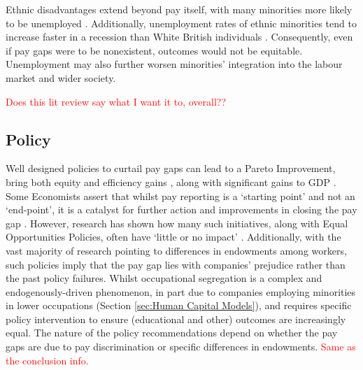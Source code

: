 \documentclass[class=article, crop=false]{standalone}
\begin{document}
Ethnic disadvantages extend beyond pay itself, with many minorities more likely to be unemployed \citep{Heath}. Additionally, unemployment rates of ethnic minorities tend to increase faster in a recession than White British individuals \citep{Jones}. Consequently, even if pay gaps were to be nonexistent, outcomes would not be equitable. Unemployment may also further worsen minorities' integration into the labour market and wider society.

\textcolor{red}{Does this lit review say what I want it to, overall??}

\subsection{Policy}
\label{sec:Policy}
Well designed policies to curtail pay gaps can lead to a Pareto Improvement, bring both equity and efficiency gains \citep{LundbergB}, along with significant gains to GDP \citep{BoE}. Some Economists assert that whilst pay reporting is a \enquote*{starting point} and not an \enquote*{end-point}, it is a catalyst for further action and improvements in closing the pay gap \citep{BoE}. However, research has shown how many such initiatives, along with Equal Opportunities Policies, often have \enquote*{little or no impact} \cite[p.~113]{Noon}. Additionally, with the vast majority of research pointing to differences in endowments among workers, such policies imply that the pay gap lies with companies' prejudice rather than the past policy failures. Whilst occupational segregation is a complex and endogenously-driven phenomenon, in part due to companies employing minorities in lower occupations (Section \ref{sec:Human Capital Models}), and requires specific policy intervention to ensure (educational and other) outcomes are increasingly equal. The nature of the policy recommendations depend on whether the pay gaps are due to pay discrimination or specific differences in endowments. \textcolor{red}{Same as the conclusion info.}

\ifstandalone

\fi
\end{document}
